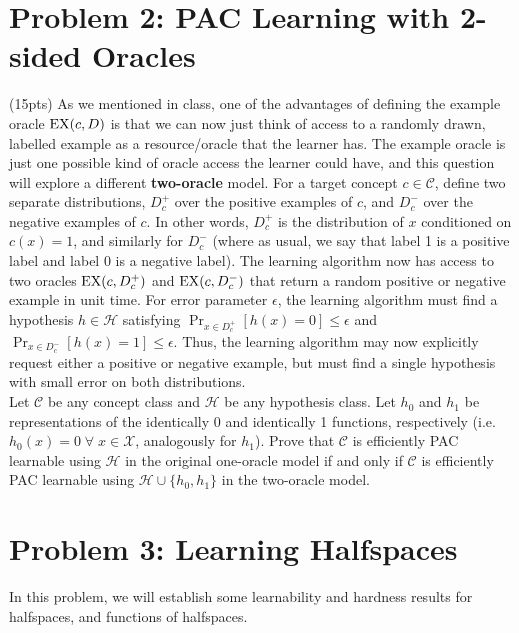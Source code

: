 \documentclass[11pt]{article}
\newcommand{\calX}{{\mathcal{X}}}
\newcommand{\calH}{{\mathcal{H}}}
\newcommand{\calC}{{\mathcal{C}}}
\newcommand{\blue}[1]{{\color{blue}#1}}
\newcommand{\exampleoracle}{{\text{\rm EX}}}
\begin{document}
\section*{Problem 2: PAC Learning with 2-sided Oracles}

(\blue{15pts}) As we mentioned in class, one of the advantages of defining the example oracle $\exampleoracle(c, D)$ is that we can now just think of access to a randomly drawn, labelled example as a resource/oracle that the learner has. The example oracle is just one possible kind of oracle access the learner could have, and this question will explore a different \textbf{two-oracle} model. For a target concept $c \in \calC$, define two separate distributions, $D_c^+$ over the positive examples of $c$, and $D_c^-$ over the negative examples of $c$. In other words, $D_c^+$ is the distribution of $x$ conditioned on $c(x)=1$, and similarly for $D_c^-$ (where as usual, we say that label 1 is a positive label and label 0 is a negative label). The learning algorithm now has access to two oracles $\exampleoracle(c, D_c^+)$ and  $\exampleoracle(c, D_c^-)$ that return a random positive or negative example in unit time. For error parameter $\epsilon$, the learning algorithm must find a hypothesis $h\in \calH$ satisfying $\Pr_{x\in D_c^+}[h(x)=0]\le \epsilon$ and $\Pr_{x\in D_c^-}[h(x)=1]\le \epsilon$. Thus, the learning algorithm may now explicitly request either a positive or negative example, but must find a single hypothesis with small error on both distributions.\\

Let $\calC$ be any concept class and $\calH$ be any hypothesis class. Let $h_0$ and $h_1$ be representations of the identically 0 and identically 1 functions, respectively (i.e. $h_0(x)=0 \; \forall \; x \in \calX$, analogously for $h_1$). Prove that $\calC$ is efficiently PAC learnable using $\calH$ in the original one-oracle model if and only if $\calC$ is efficiently PAC learnable using $\calH \cup \{h_0,h_1\}$ in the two-oracle model. 

\section*{Problem 3: Learning Halfspaces}

In this problem, we will establish some learnability and hardness results for halfspaces, and functions of halfspaces.
\end{document}
